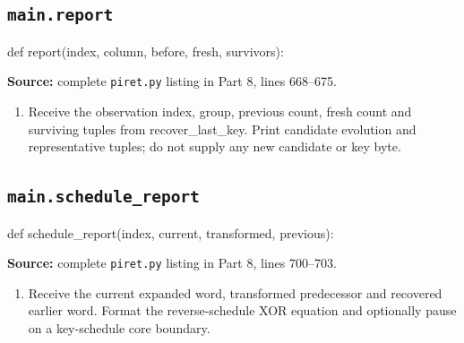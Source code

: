 \subsection{\texttt{main.report}}
\begin{lightcode}
def report(index, column, before, fresh, survivors):
\end{lightcode}
\noindent\textbf{Source:} complete \texttt{piret.py} listing in Part 8, lines 668--675.
\begin{enumerate}
\item Receive the observation index, group, previous count, fresh count and surviving tuples from recover\_last\_key. Print candidate evolution and representative tuples; do not supply any new candidate or key byte.
\end{enumerate}
\subsection{\texttt{main.schedule\_\allowbreak{}report}}
\begin{lightcode}
def schedule_report(index, current, transformed, previous):
\end{lightcode}
\noindent\textbf{Source:} complete \texttt{piret.py} listing in Part 8, lines 700--703.
\begin{enumerate}
\item Receive the current expanded word, transformed predecessor and recovered earlier word. Format the reverse-schedule XOR equation and optionally pause on a key-schedule core boundary.
\end{enumerate}
